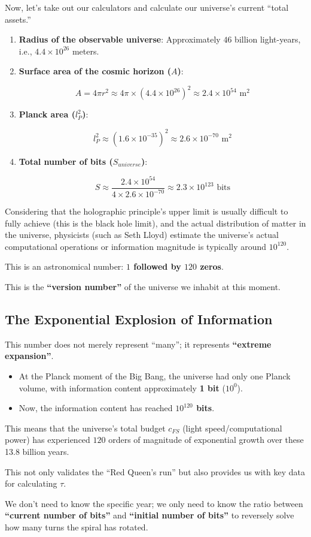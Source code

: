 Now, let's take out our calculators and calculate our universe's current ``total assets.''

\begin{enumerate}
\item \textbf{Radius of the observable universe}: Approximately $46$ billion light-years, i.e., $4.4 \times 10^{26}$ meters.

\item \textbf{Surface area of the cosmic horizon ($A$)}:

\[A = 4\pi r^2 \approx 4 \pi \times (4.4 \times 10^{26})^2 \approx 2.4 \times 10^{54} \text{ m}^2\]

\item \textbf{Planck area ($l_P^2$)}:

\[l_P^2 \approx (1.6 \times 10^{-35})^2 \approx 2.6 \times 10^{-70} \text{ m}^2\]

\item \textbf{Total number of bits ($S_{universe}$)}:

\[S \approx \frac{2.4 \times 10^{54}}{4 \times 2.6 \times 10^{-70}} \approx 2.3 \times 10^{123} \text{ bits}\]
\end{enumerate}

Considering that the holographic principle's upper limit is usually difficult to fully achieve (this is the black hole limit), and the actual distribution of matter in the universe, physicists (such as Seth Lloyd) estimate the universe's actual computational operations or information magnitude is typically around \textbf{$10^{120}$}.

This is an astronomical number: \textbf{$1$ followed by $120$ zeros}.

This is the \textbf{``version number''} of the universe we inhabit at this moment.

\subsection{The Exponential Explosion of Information}

This number does not merely represent ``many''; it represents \textbf{``extreme expansion''}.

\begin{itemize}
\item At the Planck moment of the Big Bang, the universe had only one Planck volume, with information content approximately \textbf{1 bit} ($10^0$).

\item Now, the information content has reached \textbf{$10^{120}$ bits}.
\end{itemize}

This means that the universe's total budget $c_{FS}$ (light speed/computational power) has experienced $120$ orders of magnitude of exponential growth over these 13.8 billion years.

This not only validates the ``Red Queen's run'' but also provides us with key data for calculating $\tau$.

We don't need to know the specific year; we only need to know the ratio between \textbf{``current number of bits''} and \textbf{``initial number of bits''} to reversely solve how many turns the spiral has rotated.

